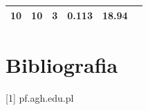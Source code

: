 \documentclass{article}
\begin{document}
\begin{table}[h]
\begin{tabular}{|c|c|c|c|c|c|}
10                                                   & 10                                                 & 3                                                               & 0.113                                                      & 18.94                                                             &                                                                    \\ \hline
\end{tabular}
\end{table}

\section{Bibliografia}
[1] pf.agh.edu.pl
\end{document}
